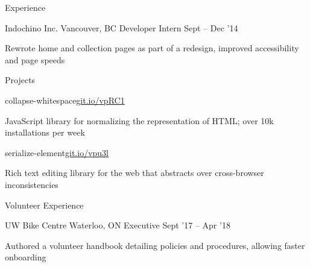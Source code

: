 \documentclass{resume} %
\begin{document}
\begin{rSection}{Experience}
  \begin{rSubsection}{Indochino Inc.}
                     {Vancouver, BC}
                     {Developer Intern}
                     {Sept -- Dec '14}
    \item Rewrote home and collection pages as part of a redesign, improved accessibility and page speeds
  \end{rSubsection}

\end{rSection}


\begin{rSection}{Projects}
  \begin{rSubsection}{collapse-whitespace}{\href{https://git.io/vpRC1}{git.io/vpRC1}}{}{}
    \item JavaScript library for normalizing the representation of HTML; over 10k installations per week
  \end{rSubsection}

  \begin{rSubsection}{serialize-element}{\href{https://git.io/vpu3l}{git.io/vpu3l}}{}{}
    \item Rich text editing library for the web that abstracts over cross-browser inconsistencies
  \end{rSubsection}

\end{rSection}


\begin{rSection}{Volunteer Experience}
  \begin{rSubsection}{UW Bike Centre}
                     {Waterloo, ON}
                     {Executive}
                     {Sept '17 -- Apr '18}
    \item Authored a volunteer handbook detailing policies and procedures, allowing faster onboarding
  \end{rSubsection}
\end{rSection}
\end{document}
